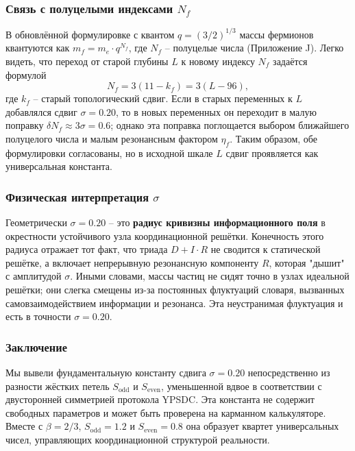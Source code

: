 \documentclass[12pt,a4paper]{article}
\begin{document}
	\subsubsection{Связь с полуцелыми индексами \(N_f\)}
	
	В обновлённой формулировке с квантом \(q = (3/2)^{1/3}\) массы фермионов квантуются как \(m_f = m_e \cdot q^{N_f}\), где \(N_f\) -- полуцелые числа (Приложение J). Легко видеть, что переход от старой глубины \(L\) к новому индексу \(N_f\) задаётся формулой
	\[
	N_f = 3(11 - k_f) = 3(L - 96),
	\]
	где \(k_f\) -- старый топологический сдвиг. Если в старых переменных к \(L\) добавлялся сдвиг \(\sigma = 0.20\), то в новых переменных он переходит в малую поправку \(\delta N_f \approx 3\sigma = 0.6\); однако эта поправка поглощается выбором ближайшего полуцелого числа и малым резонансным фактором \(\eta_f\). Таким образом, обе формулировки согласованы, но в исходной шкале \(L\) сдвиг проявляется как универсальная константа.
	
	\subsubsection{Физическая интерпретация \(\sigma\)}
	
	Геометрически \(\sigma = 0.20\) -- это \textbf{радиус кривизны информационного поля} в окрестности устойчивого узла координационной решётки. Конечность этого радиуса отражает тот факт, что триада \(D+I\cdot R\) не сводится к статической решётке, а включает непрерывную резонансную компоненту \(R\), которая "дышит" с амплитудой \(\sigma\). Иными словами, массы частиц не сидят точно в узлах идеальной решётки; они слегка смещены из-за постоянных флуктуаций словаря, вызванных самовзаимодействием информации и резонанса. Эта неустранимая флуктуация и есть в точности \(\sigma = 0.20\).
	
	\subsubsection{Заключение}
	
	Мы вывели фундаментальную константу сдвига \(\sigma = 0.20\) непосредственно из разности жёстких петель \(S_{\mathrm{odd}}\) и \(S_{\mathrm{even}}\), уменьшенной вдвое в соответствии с двусторонней симметрией протокола YPSDC. Эта константа не содержит свободных параметров и может быть проверена на карманном калькуляторе. Вместе с \(\beta = 2/3\), \(S_{\mathrm{odd}} = 1.2\) и \(S_{\mathrm{even}} = 0.8\) она образует квартет универсальных чисел, управляющих координационной структурой реальности.
	
\end{document}
